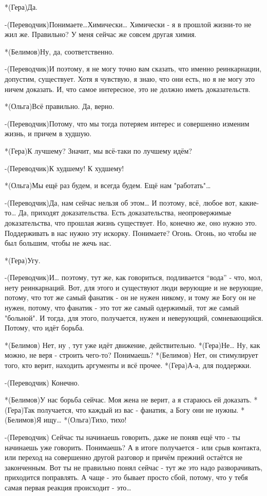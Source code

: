 *(Гера)Да.

-(Переводчик)Понимаете…Химически… Химически - я в прошлой жизни-то не жил же. Правильно? У меня сейчас же совсем другая химия.

*(Белимов)Ну, да, соответственно.

-(Переводчик)И поэтому, я не могу точно вам сказать, что именно реинкарнации, допустим, существует. Хотя я чувствую, я знаю, что они есть, но я не могу это ничем доказать. И, что самое интересное, это не должно иметь доказательств.

*(Ольга)Всё правильно. Да, верно.

-(Переводчик)Потому, что мы тогда потеряем интерес и совершенно изменим жизнь, и причем в худшую.

*(Гера)К лучшему? Значит, мы всё-таки по лучшему идём? 

-(Переводчик)К худшему! К худшему!

*(Ольга)Мы ещё раз будем, и всегда будем. Ещё нам "работать"…

-(Переводчик)Да, нам сейчас нельзя об этом… И поэтому, всё, любое вот, какие-то… Да, приходят доказательства. Есть доказательства, неопровержимые доказательства, что прошлая жизнь существует. Но, конечно же, оно нужно это. Поддерживать в нас нужно эту искорку. Понимаете? Огонь. Огонь, но чтобы не был большим, чтобы не жечь нас.

*(Гера)Угу.

-(Переводчик)И… поэтому, тут же, как говориться, подливается “вода” - что, мол, нету реинкарнаций. Вот, для этого и существуют люди верующие и не верующие, потому, что тот же самый фанатик - он не нужен никому, и тому же Богу он не нужен, потому, что фанатик - это тот же самый одержимый, тот же самый "больной". И тогда, для этого, получается, нужен и неверующий, сомневающийся. Потому, что идёт борьба.

*(Белимов) Нет, ну , тут уже идёт движение, действительно.
*(Гера)Не… Ну, как можно, не веря - строить чего-то? Понимаешь?
*(Белимов) Нет, он стимулирует того, кто верит, находить аргументы и всё прочее.
*(Гера)А-а, для поддержки.

-(Переводчик) Конечно. 

*(Белимов)У нас борьба сейчас. Моя жена не верит, а я стараюсь ей доказать.
*(Гера)Так получается, что каждый из вас - фанатик, а Богу они не нужны.
*(Белимов)Я ищу…
*(Ольга)Тихо, тихо!

-(Переводчик) Сейчас ты начинаешь говорить, даже не поняв ещё что - ты начинаешь уже говорить. Понимаешь? А в итоге получается - или срыв контакта, или переход на совершенно другой разговор и причём прежний остаётся не законченным. Вот ты не правильно понял сейчас - тут же это надо разворачивать, приходится поправлять. А чаще - это бывает просто сбой, потому, что у тебя самая первая реакция происходит - это…